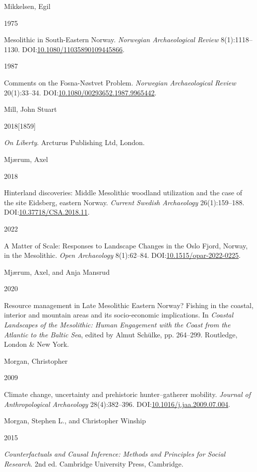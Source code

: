 \documentclass[
  a4paper,
  oneside]{uiophdthesis}
\newlength{\cslhangindent}
\newlength{\csllabelwidth}
\newlength{\cslentryspacingunit} %
\newenvironment{CSLReferences}[2] %
 {%
  \setlength{\parindent}{0pt}
  \ifodd #1
  \let\oldpar\par
  \def\par{\hangindent=\cslhangindent\oldpar}
  \fi
  \setlength{\parskip}{#2\cslentryspacingunit}
 }%
 {}
\newcommand{\CSLBlock}[1]{#1\hfill\break}
\newcommand{\CSLLeftMargin}[1]{\parbox[t]{\csllabelwidth}{#1}}
\newcommand{\CSLRightInline}[1]{\parbox[t]{\linewidth - \csllabelwidth}{#1}\break}
\begin{document}
\begin{CSLReferences}{0}{0}
\leavevmode{}%
\CSLBlock{Mikkelsen, Egil}
\CSLLeftMargin{ 1975}
\CSLRightInline{{Mesolithic in South-Eastern Norway}. \emph{Norwegian Archaeological Review} 8(1):1118--1130. DOI:\href{https://doi.org/10.1080/11035890109445866}{10.1080/11035890109445866}.}

\leavevmode{}%
\CSLLeftMargin{ 1987 }
\CSLRightInline{{Comments on the Fosna-Nøstvet Problem}. \emph{Norwegian Archaeological Review} 20(1):33--34. DOI:\href{https://doi.org/10.1080/00293652.1987.9965442}{10.1080/00293652.1987.9965442}.}

\leavevmode{}%
\CSLBlock{Mill, John Stuart}
\CSLLeftMargin{ 2018{[}1859{]}}
\CSLRightInline{\emph{{On Liberty}}. Arcturus Publishing Ltd, London.}

\leavevmode{}%
\CSLBlock{Mjærum, Axel}
\CSLLeftMargin{ 2018}
\CSLRightInline{Hinterland discoveries: Middle Mesolithic woodland utilization and the case of the site Eidsberg, eastern Norway. \emph{Current Swedish Archaeology} 26(1):159--188. DOI:\href{https://doi.org/10.37718/CSA.2018.11}{10.37718/CSA.2018.11}.}

\leavevmode{}%
\CSLLeftMargin{ 2022 }
\CSLRightInline{{A Matter of Scale: Responses to Landscape Changes in the Oslo Fjord, Norway, in the Mesolithic}. \emph{Open Archaeology} 8(1):62--84. DOI:\href{https://doi.org/10.1515/opar-2022-0225}{10.1515/opar-2022-0225}.}

\leavevmode{}%
\CSLBlock{Mjærum, Axel, and Anja Mansrud}
\CSLLeftMargin{ 2020}
\CSLRightInline{{Resource management in Late Mesolithic Eastern Norway? Fishing in the coastal, interior and mountain areas and its socio-economic implications}. In \emph{{Coastal Landscapes of the Mesolithic: Human Engagement with the Coast from the Atlantic to the Baltic Sea}}, edited by Almut Schülke, pp. 264--299. Routledge, London \& New York.}

\leavevmode{}%
\CSLBlock{Morgan, Christopher}
\CSLLeftMargin{ 2009}
\CSLRightInline{Climate change, uncertainty and prehistoric hunter--gatherer mobility. \emph{Journal of Anthropological Archaeology} 28(4):382--396. DOI:\href{https://doi.org/10.1016/j.jaa.2009.07.004}{10.1016/j.jaa.2009.07.004}.}

\leavevmode{}%
\CSLBlock{Morgan, Stephen L., and Christopher Winship}
\CSLLeftMargin{ 2015}
\CSLRightInline{\emph{{Counterfactuals and Causal Inference: Methods and Principles for Social Research}}. 2nd ed. Cambridge University Press, Cambridge.}


\end{CSLReferences}
\end{document}
